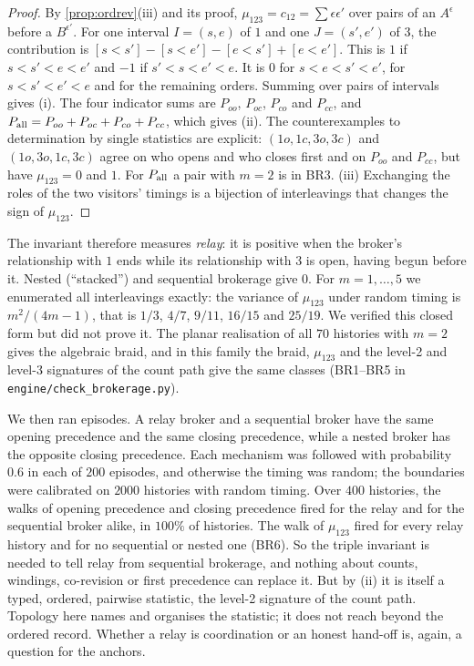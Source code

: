 \documentclass[11pt]{article}
\theoremstyle{definition}\newtheorem{definition}[theorem]{Definition}\newtheorem{remark}[theorem]{Remark}\newtheorem{example}[theorem]{Example}\newtheorem{problem}[theorem]{Open problem}\crefname{problem}{Problem}{Problems}
\begin{document}
\begin{proof}
By \cref{prop:ordrev}(iii) and its proof, $\mu_{123}=c_{12}=\sum\epsilon\epsilon'$ over pairs of an $A^\epsilon$ before a $B^{\epsilon'}$. For one interval $I=(s,e)$ of $1$ and one $J=(s',e')$ of $3$, the contribution is $[s<s']-[s<e']-[e<s']+[e<e']$. This is $1$ if $s<s'<e<e'$ and $-1$ if $s'<s<e'<e$. It is $0$ for $s<e<s'<e'$, for $s<s'<e'<e$ and for the remaining orders. Summing over pairs of intervals gives (i). The four indicator sums are $P_{oo}$, $P_{oc}$, $P_{co}$ and $P_{cc}$, and $P_{\rm all}=P_{oo}+P_{oc}+P_{co}+P_{cc}$, which gives (ii). The counterexamples to determination by single statistics are explicit: $(1o,1c,3o,3c)$ and $(1o,3o,1c,3c)$ agree on who opens and who closes first and on $P_{oo}$ and $P_{cc}$, but have $\mu_{123}=0$ and $1$. For $P_{\rm all}$ a pair with $m=2$ is in BR3. (iii) Exchanging the roles of the two visitors' timings is a bijection of interleavings that changes the sign of $\mu_{123}$.
\end{proof}

The invariant therefore measures \emph{relay}: it is positive when the broker's relationship with $1$ ends while its relationship with $3$ is open, having begun before it. Nested (``stacked'') and sequential brokerage give $0$. For $m=1,\dots,5$ we enumerated all interleavings exactly: the variance of $\mu_{123}$ under random timing is $m^2/(4m-1)$, that is $1/3$, $4/7$, $9/11$, $16/15$ and $25/19$. We verified this closed form but did not prove it. The planar realisation of all $70$ histories with $m=2$ gives the algebraic braid, and in this family the braid, $\mu_{123}$ and the level-2 and level-3 signatures of the count path give the same classes (BR1--BR5 in \texttt{engine/check\_brokerage.py}).

We then ran episodes. A relay broker and a sequential broker have the same opening precedence and the same closing precedence, while a nested broker has the opposite closing precedence. Each mechanism was followed with probability $0.6$ in each of $200$ episodes, and otherwise the timing was random; the boundaries were calibrated on $2000$ histories with random timing. Over $400$ histories, the walks of opening precedence and closing precedence fired for the relay and for the sequential broker alike, in $100\%$ of histories. The walk of $\mu_{123}$ fired for every relay history and for no sequential or nested one (BR6). So the triple invariant is needed to tell relay from sequential brokerage, and nothing about counts, windings, co-revision or first precedence can replace it. But by (ii) it is itself a typed, ordered, pairwise statistic, the level-2 signature of the count path. Topology here names and organises the statistic; it does not reach beyond the ordered record. Whether a relay is coordination or an honest hand-off is, again, a question for the anchors.
\end{document}

